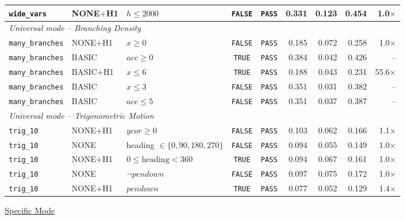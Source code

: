 {\begin{longtable}{p{} p{} p{} c c r r r r}
\texttt{wide\_vars} & NONE$+$H1 & $h \leq 2000$ & \texttt{FALSE} & \texttt{PASS} & 0.331 & 0.123 & 0.454 & 1.0$\times$ \\
\midrule
\multicolumn{9}{l}{\textit{Universal mode -- Branching Density}} \\
\midrule
\texttt{many\_branches} & NONE$+$H1 & $x \geq 0$ & \texttt{FALSE} & \texttt{PASS} & 0.185 & 0.072 & 0.258 & 1.0$\times$ \\
\texttt{many\_branches} & BASIC & $\mathit{acc} \geq 0$ & \texttt{TRUE} & \texttt{PASS} & 0.384 & 0.042 & 0.426 & -- \\
\texttt{many\_branches} & BASIC$+$H1 & $x \leq 6$ & \texttt{TRUE} & \texttt{PASS} & 0.188 & 0.043 & 0.231 & 55.6$\times$ \\
\texttt{many\_branches} & BASIC & $x \leq 3$ & \texttt{FALSE} & \texttt{PASS} & 0.351 & 0.031 & 0.382 & -- \\
\texttt{many\_branches} & BASIC & $\mathit{acc} \leq 5$ & \texttt{FALSE} & \texttt{PASS} & 0.351 & 0.037 & 0.387 & -- \\
\midrule
\multicolumn{9}{l}{\textit{Universal mode -- Trigonometric Motion}} \\
\midrule
\texttt{trig\_10} & NONE$+$H1 & $\mathit{ycor} \geq 0$ & \texttt{FALSE} & \texttt{PASS} & 0.103 & 0.062 & 0.166 & 1.1$\times$ \\
\texttt{trig\_10} & NONE & heading $\in \{0,90,180,270\}$ & \texttt{FALSE} & \texttt{PASS} & 0.094 & 0.055 & 0.149 & 1.0$\times$ \\
\texttt{trig\_10} & NONE$+$H1 & $0 \leq \text{heading} < 360$ & \texttt{TRUE} & \texttt{PASS} & 0.094 & 0.067 & 0.161 & 1.0$\times$ \\
\texttt{trig\_10} & NONE & $\neg\mathit{pendown}$ & \texttt{FALSE} & \texttt{PASS} & 0.097 & 0.075 & 0.172 & 1.0$\times$ \\
\texttt{trig\_10} & NONE$+$H1 & $\mathit{pendown}$ & \texttt{TRUE} & \texttt{PASS} & 0.077 & 0.052 & 0.129 & 1.4$\times$ \\
\end{longtable}
}

\underline{Specific Mode}

